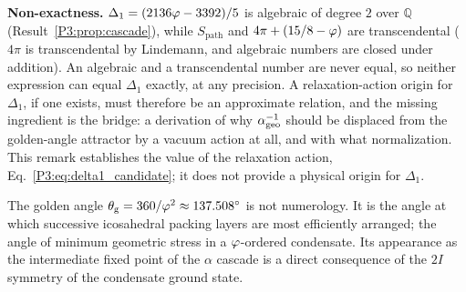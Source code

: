 \begin{remark}
\textbf{Non-exactness.} $\Delta_1 = (2136\varphi-3392)/5$ is algebraic of
degree $2$ over $\mathbb{Q}$ (Result~\ref{P3:prop:cascade}), while
$S_{\mathrm{path}}$ and $4\pi+(15/8-\varphi)$ are transcendental ($4\pi$ is
transcendental by Lindemann, and algebraic numbers are closed under
addition). An algebraic and a transcendental number are never equal, so
neither expression can equal $\Delta_1$ exactly, at any precision. A
relaxation-action origin for $\Delta_1$, if one exists, must therefore
be an approximate relation, and the missing ingredient is the bridge:
a derivation of why $\alpha^{-1}_{\mathrm{geo}}$ should be displaced from the
golden-angle attractor by a vacuum action at all, and with what
normalization. This remark establishes the value of the relaxation
action, Eq.~\eqref{P3:eq:delta1_candidate}; it does not provide a
physical origin for $\Delta_1$.
\end{remark}

\begin{remark}
\label{P3:rem:packing_layers}
The golden angle $\theta_{\mathrm{g}} = 360/\varphi^2 \approx 137.508^\circ$ is
not numerology.  It is the angle at which successive icosahedral
packing layers are most efficiently arranged; the angle of minimum
geometric stress in a $\varphi$-ordered condensate.  Its appearance as
the intermediate fixed point of the $\alpha$ cascade is a direct
consequence of the $2I$ symmetry of the condensate ground state.
\end{remark}

